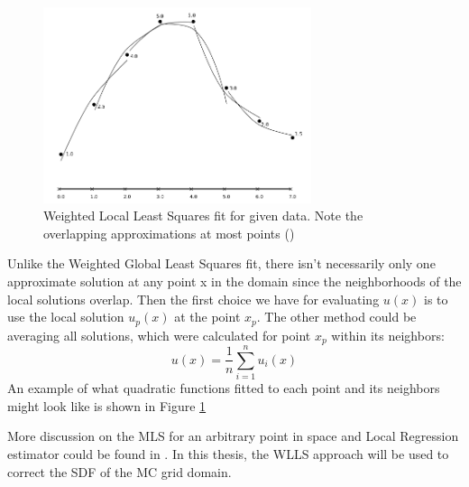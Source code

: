 \begin{figure}[H]
	\begin{center}
		\includegraphics[width=0.7\textwidth]{figures/WLLS.png}
	\end{center}
	\caption{Weighted Local Least Squares fit for given data. Note the overlapping approximations at most points (\cite{MLSIntro})}
	\label{fig:WLLS}
\end{figure}
Unlike the Weighted Global Least Squares fit, there isn’t necessarily only one approximate solution at any point x in the domain since the neighborhoods of the local solutions overlap. Then the first choice we have for evaluating $u(x)$ is to use the local solution $u_p(x)$ at the point $x_p$. The other method could be averaging all solutions, which were calculated for point $x_p$ within its neighbors:
\begin{equation}
	u(x) = \dfrac{1}{n} \sum_{i=1}^n{u_i(x)}
\end{equation}
An example of what quadratic functions fitted to each point and its neighbors might look like is shown in Figure \ref{fig:WLLS}

More discussion on the MLS for an arbitrary point in space and Local Regression estimator could be found in \cite{MLSIntro}. In this thesis, the WLLS approach will be used to correct the SDF of the MC grid domain.

